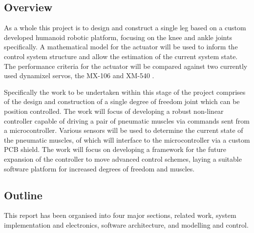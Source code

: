 \documentclass[11pt,a4paper]{article}
\begin{document}
\subsection{Overview}
\label{sub:overview}

As a whole this project is to design and construct a single leg based on a custom developed humanoid robotic platform, focusing on the knee and ankle joints specifically. A mathematical model for the actuator will be used to inform the control system structure and allow the estimation of the current system state. The performance criteria for the actuator will be compared against two currently used dynamixel servos, the MX-106 \cite{robotis_mx106} and XM-540 \cite{robotis}.

Specifically the work to be undertaken within this stage of the project comprises of the design and construction of a single degree of freedom joint which can be position controlled. The work will focus of developing a robust non-linear controller capable of driving a pair of pneumatic muscles via commands sent from a microcontroller. Various sensors will be used to determine the current state of the pneumatic muscles, of which will interface to the microcontroller via a custom PCB shield. The work will focus on developing a framework for the future expansion of the controller to move advanced control schemes, laying a suitable software platform for increased degrees of freedom and muscles.

\newpage
\subsection{Outline}
\label{sub:outline}

This report has been organised into four major sections, related work, system implementation and electronics, software architecture, and modelling and control.
\end{document}
